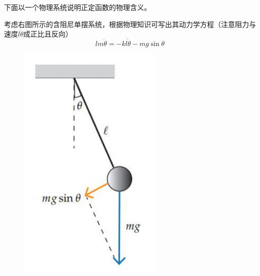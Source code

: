 下面以一个物理系统说明正定函数的物理含义。
\begin{example}[正定函数与能量]\label{pendulum}
  考虑右图所示的含阻尼单摆系统，根据物理知识可写出其动力学方程（注意阻力与速度$l\dot{\theta}$成正比且反向）
  \[lm\ddot{\theta}=-kl\dot{\theta}-mg\sin\theta\]

  \begin{figure}
  	\includegraphics[width=\linewidth]{./figure/nonlinear/pendulum.png}
  \end{figure}


\end{example}
